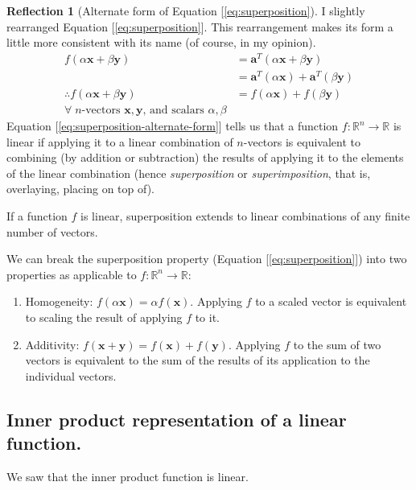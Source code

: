 \documentclass[11pt]{book}
\theoremstyle{definition}
\theoremstyle{plain}
\theoremstyle{problemstyle}
\theoremstyle{remark}
\theoremstyle{definition}
\newtheorem{reflection}{Reflection}
\begin{document}
\begin{reflection}[Alternate form of Equation [\ref{eq:superposition}]
    I slightly rearranged Equation [\ref{eq:superposition}]. This rearrangement makes its form a little more consistent with its name (of course, in my opinion).
\begin{equation}
    \label{eq:superposition-alternate-form}
    \begin{aligned}
        f(\alpha\boldsymbol{x}+\beta\boldsymbol{y})&=\boldsymbol{a}^T(\alpha\boldsymbol{x}+\beta\boldsymbol{y})\\
                                                   &=\boldsymbol{a}^T(\alpha\boldsymbol{x})+\boldsymbol{a}^T(\beta\boldsymbol{y})\\
        \therefore f(\alpha\boldsymbol{x}+\beta\boldsymbol{y})&=f(\alpha\boldsymbol{x})+f(\beta\boldsymbol{y})\\
                                                   \text{$\forall\;n$-vectors $\boldsymbol{x,y}$, and scalars $\alpha,\beta$}
    \end{aligned}
\end{equation}
    Equation [\ref{eq:superposition-alternate-form}] tells us that a function $f:\mathbb{R}^n\rightarrow\mathbb{R}$ is linear if applying it to a linear combination of $n$-vectors is equivalent to combining (by addition or subtraction) the results of applying it to the elements of the linear combination (hence \emph{superposition} or \emph{superimposition}, that is, overlaying, placing on top of).
\end{reflection}

If a function $f$ is linear, superposition extends to linear combinations of any finite number of vectors.

We can break the superposition property (Equation [\ref{eq:superposition}]) into two properties as applicable to $f:\mathbb{R}^n\rightarrow\mathbb{R}$:
\begin{enumerate}
    \item Homogeneity: $f(\alpha\boldsymbol{x})=\alpha f(\boldsymbol{x})$. Applying $f$ to a scaled vector is equivalent to scaling the result of applying $f$ to it. 
    \item Additivity: $f(\boldsymbol{x}+\boldsymbol{y})=f(\boldsymbol{x})+f(\boldsymbol{y})$. Applying $f$ to the sum of two vectors is equivalent to the sum of the results of its application to the individual vectors.
\end{enumerate}

\subsection*{Inner product representation of a linear function.}
We saw that the inner product function is linear. 
\end{document}
